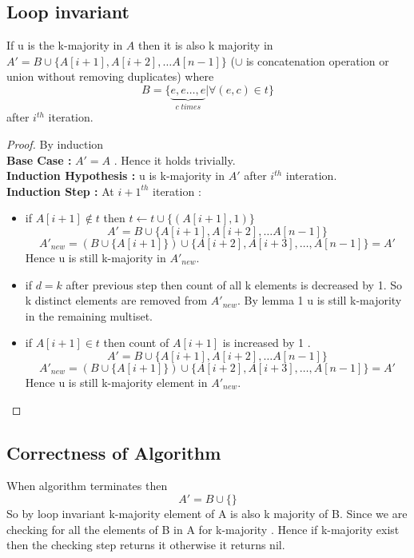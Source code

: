 \documentclass[11pt]{article}
\begin{document}
\subsection*{Loop invariant}
If u is the k-majority in $A$ then it is also k majority in $A'=B \cup \lbrace A[i+1],A[i+2],\ldots A[n-1] \rbrace$ ($\cup$ is concatenation operation or union without removing duplicates) where \[B = \lbrace \underbrace{e,e \ldots ,e}_{c \; times} | \forall (e,c) \in t \rbrace \] after $i^{th}$ iteration.
\begin{proof}
By induction \\
\textbf{Base Case :}  $A'=A$ . Hence it holds trivially. \\
\textbf{Induction Hypothesis :} u is k-majority in $A'$ after $i^{th}$ interation. \\
\textbf{Induction Step :} At $i+1^{th}$ iteration : \\
\begin{itemize}
\item if $A[i+1] \notin t$ then $ t \leftarrow t \cup \lbrace (A[i+1],1) \rbrace$ \\
\[A'=B\cup \lbrace A[i+1],A[i+2],\ldots A[n-1] \rbrace\]
\[A'_{new} = (B\cup \lbrace A[i+1]\rbrace)\cup \lbrace A[i+2],A[i+3],\ldots,A[n-1]\rbrace=A'\]
Hence u is still k-majority in $A'_{new}$.
\item if $d=k$ after previous step then count of all k elements is decreased by 1. So k distinct elements are removed from $A'_{new}$. By lemma 1 u is still k-majority in the remaining multiset.  
\item if $A[i+1] \in t$ then count of $A[i+1]$ is increased by 1 . \\
\[A'=B\cup \lbrace A[i+1],A[i+2],\ldots A[n-1] \rbrace\]
\[A'_{new} = (B\cup \lbrace A[i+1]\rbrace)\cup \lbrace A[i+2],A[i+3],\ldots,A[n-1]\rbrace=A'\]
Hence u is still k-majority element in $A'_{new}$.

\end{itemize}
\end{proof}

\subsection*{Correctness of Algorithm}
When algorithm terminates then 
\[A'=B \cup \lbrace \rbrace\]
So by loop invariant k-majority element of A is also k majority of B. Since we are checking for all the elements of B in A for k-majority . Hence if k-majority exist then the checking step returns it otherwise it returns nil. 
\pagebreak
\end{document}
